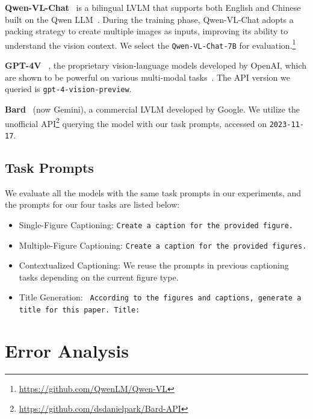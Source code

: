 \documentclass[11pt]{article}
\begin{document}
\noindent\textbf{Qwen-VL-Chat}~\citep{Qwen-VL} is
a bilingual LVLM that supports both English and Chinese built on the Qwen LLM~\citep{qwen}. 
During the training phase, Qwen-VL-Chat adopts a packing strategy to create multiple images as inputs,
improving its ability to understand the vision context. We select the \texttt{Qwen-VL-Chat-7B} for evaluation.\footnote{\url{https://github.com/QwenLM/Qwen-VL}}



\noindent\textbf{GPT-4V}
~\citep{gpt4v}, the proprietary vision-language models developed by OpenAI, which are shown to be powerful on various multi-modal tasks~\citep{yang2023dawn}. The API version we queried is \texttt{gpt-4-vision-preview}.

\noindent\textbf{Bard}~\citep{bard} (now Gemini), a commercial LVLM developed by Google. We utilize the unofficial API\footnote{\url{https://github.com/dsdanielpark/Bard-API}} querying the model with our task prompts, accessed on \texttt{2023-11-17}.


\subsection{Task Prompts}
We evaluate all the models with the same task prompts in our experiments, and the prompts for our four tasks are listed below:

\begin{itemize}
    \item Single-Figure Captioning:  \texttt{Create a caption for the provided figure.}
    \item Multiple-Figure Captioning: \texttt{Create a caption for the provided figures.}
    \item Contextualized Captioning: We reuse the prompts in previous captioning tasks depending on the current figure type.
    \item Title Generation: \texttt{
According to the figures and captions, generate a title for this paper. Title:} 
\end{itemize}





\section{Error Analysis}
\label{apx:case}
\end{document}
